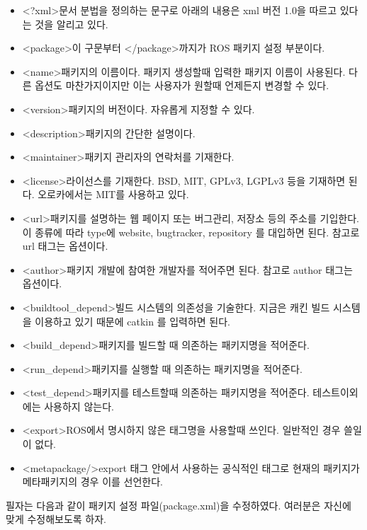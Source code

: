 \begin{itemize}
\item \textless{?xml}\textgreater 문서 분법을 정의하는 문구로 아래의 내용은 xml 버전 1.0을 따르고 있다는 것을 알리고 있다.
\item \textless{package}\textgreater 이 구문부터 \textless/package\textgreater 까지가 ROS 패키지 설정 부분이다.
\item \textless{name}\textgreater 패키지의 이름이다. 패키지 생성할때 입력한 패키지 이름이 사용된다. 다른 옵션도 마찬가지이지만 이는 사용자가 원할때 언제든지 변경할 수 있다.
\item \textless{version}\textgreater 패키지의 버전이다. 자유롭게 지정할 수 있다.
\item \textless{description}\textgreater 패키지의 간단한 설명이다. 
\item \textless{maintainer}\textgreater 패키지 관리자의 연락처를 기재한다.
\item \textless{license}\textgreater 라이선스를 기재한다. BSD, MIT, GPLv3, LGPLv3 등을 기재하면 된다. 오로카에서는 MIT를 사용하고 있다.
\item \textless{url}\textgreater 패키지를 설명하는 웹 페이지 또는 버그관리, 저장소 등의 주소를 기입한다. 이 종류에 따라 type에  website, bugtracker, repository 를 대입하면 된다. 참고로 url 태그는 옵션이다.
\item \textless{author}\textgreater 패키지 개발에 참여한 개발자를 적어주면 된다. 참고로 author 태그는 옵션이다.
\item \textless{buildtool\_depend}\textgreater 빌드 시스템의 의존성을 기술한다. 지금은 캐킨 빌드 시스템을 이용하고 있기 때문에 catkin 를 입력하면 된다.
\item \textless{build\_depend}\textgreater 패키지를 빌드할 때 의존하는 패키지명을 적어준다.
\item \textless{run\_depend}\textgreater 패키지를 실행할 때 의존하는 패키지명을 적어준다.
\item \textless{test\_depend}\textgreater 패키지를 테스트할때 의존하는 패키지명을 적어준다. 테스트이외에는 사용하지 않는다.
\item \textless{export}\textgreater ROS에서 명시하지 않은 태그명을 사용할때 쓰인다. 일반적인 경우 쓸일이 없다.
\item \textless{metapackage/}\textgreater export 태그 안에서 사용하는 공식적인 태그로 현재의 패키지가 메타패키지의 경우 이를 선언한다.
\end{itemize}

\noindent
필자는 다음과 같이 패키지 설정 파일(package.xml)을 수정하였다. 여러분은 자신에 맞게 수정해보도록 하자.

